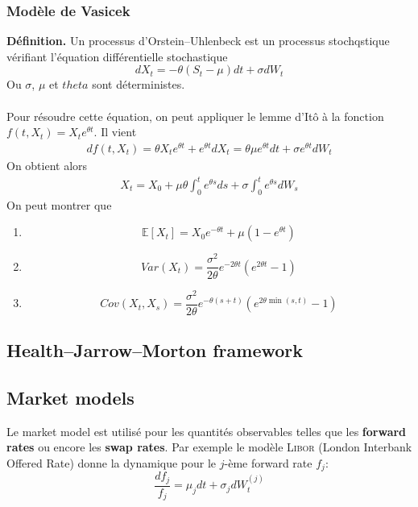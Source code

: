 \documentclass[a4paper]{article}
\begin{document}
\subsubsection{Modèle de Vasicek}
\textbf{Définition.} Un processus d'Orstein--Uhlenbeck est un processus stochqstique vérifiant l'équation différentielle stochastique
\begin{equation}
    dX_t = -\theta (S_t - \mu) dt + \sigma dW_t
\end{equation}
Ou $\sigma$, $\mu$ et $theta$ sont déterministes.
\\
\vspace{0.5mm} \\
Pour résoudre cette équation, on peut appliquer le lemme d'Itô à la fonction $f(t, X_t) = X_t e^{\theta t}$. Il vient 
\begin{align}
    df(t, X_t) = \theta X_t e^{\theta t} + e^{\theta t}dX_t = \theta \mu  e^{\theta t} dt + \sigma e^{\theta t}dW_t
\end{align}
On obtient alors 
\begin{align}
    X_t = X_0 + \mu \theta \int_{0}^{t} e^{\theta s}ds + \sigma  \int_{0}^{t} e^{\theta s}dW_s
\end{align}
On peut montrer que
\begin{enumerate}[label=\textit{(\roman*)}]
    \item \[\mathbb{E}[X_t] = X_0e^{- \theta t} + \mu (1-e^{\theta t}) \]
    \item \[Var(X_t)=\frac{\sigma^2}{2\theta} e^{-2\theta t}(e^{2\theta t} -1)  \]
    \item \[Cov(X_t,X_s) = \frac{\sigma^2}{2\theta} e^{-\theta(s+t)}(e^{2\theta \min{(s,t)}} -1) \]
\end{enumerate}

\subsection{Health--Jarrow--Morton framework}

\subsection{Market models}
Le market model est utilisé pour les quantités observables telles que les \textbf{forward rates} ou encore les \textbf{swap rates}. Par exemple le modèle \textsc{Libor} (London Interbank Offered Rate) donne la dynamique pour le $j$-ème forward rate $f_j$:
\begin{equation*}
    \frac{df_j}{f_j} = \mu_j dt + \sigma_j dW_t^{(j)}
\end{equation*}
\end{document}
